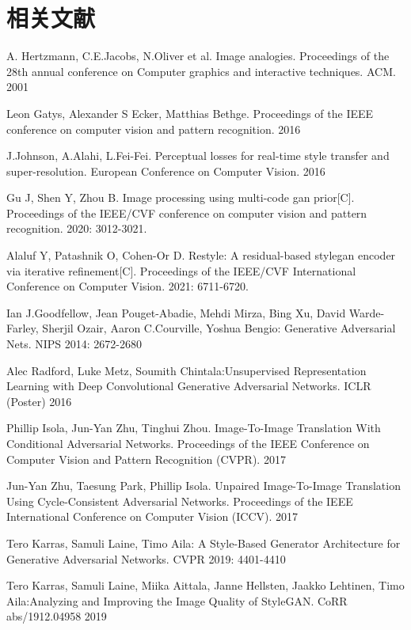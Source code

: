 \section{相关文献}

\begin{description}
\item A. Hertzmann, C.E.Jacobs, N.Oliver et al. Image analogies. Proceedings of the 28th annual conference on Computer graphics and interactive techniques. ACM. 2001
\item Leon Gatys, Alexander S Ecker, Matthias Bethge. Proceedings of the IEEE conference on computer vision and pattern recognition. 2016
\item J.Johnson, A.Alahi, L.Fei-Fei. Perceptual losses for real-time style transfer and super-resolution. European Conference on Computer Vision. 2016
\item Gu J, Shen Y, Zhou B. Image processing using multi-code gan prior[C]. Proceedings of the IEEE/CVF conference on computer vision and pattern recognition. 2020: 3012-3021.
\item Alaluf Y, Patashnik O, Cohen-Or D. Restyle: A residual-based stylegan encoder via iterative refinement[C]. Proceedings of the IEEE/CVF International Conference on Computer Vision. 2021: 6711-6720.
\item Ian J.Goodfellow, Jean Pouget-Abadie, Mehdi Mirza, Bing Xu, David Warde-Farley, Sherjil Ozair, Aaron C.Courville, Yoshua Bengio: Generative Adversarial Nets. NIPS 2014: 2672-2680 
\item Alec Radford, Luke Metz, Soumith Chintala:Unsupervised Representation Learning with Deep Convolutional Generative Adversarial Networks. ICLR (Poster) 2016
\item Phillip Isola, Jun-Yan Zhu, Tinghui Zhou. Image-To-Image Translation With Conditional Adversarial Networks. Proceedings of the IEEE Conference on Computer Vision and Pattern Recognition (CVPR). 2017
\item Jun-Yan Zhu, Taesung Park, Phillip Isola. Unpaired Image-To-Image Translation Using Cycle-Consistent Adversarial Networks. Proceedings of the IEEE International Conference on Computer Vision (ICCV). 2017
\item Tero Karras, Samuli Laine, Timo Aila: A Style-Based Generator Architecture for Generative Adversarial Networks. CVPR 2019: 4401-4410
\item Tero Karras, Samuli Laine, Miika Aittala, Janne Hellsten, Jaakko Lehtinen, Timo Aila:Analyzing and Improving the Image Quality of StyleGAN. CoRR abs/1912.04958 2019

\end{description}
